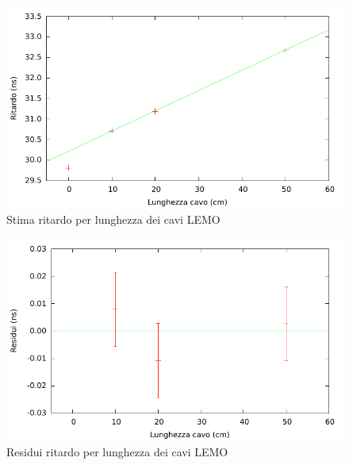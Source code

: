 \documentclass[a4paper,11pt,italian]{report}
\begin{document}
\begin{minipage}{0.45\linewidth}
\centering
\begin{figure}[H]
\includegraphics[width=\columnwidth,keepaspectratio]{../out/chio/tempo_residui}
\caption{\small{Stima ritardo per lunghezza dei cavi LEMO}}
\end{figure}
\end{minipage}
\hspace{\fill}
\begin{minipage}{0.45\linewidth}
\centering
\begin{figure}[H]
\includegraphics[width=\columnwidth,keepaspectratio]{../out/chio/tempo_ritardores}
\caption{\small{Residui ritardo per lunghezza dei cavi LEMO}}
\end{figure}
\end{minipage}
\end{document}
